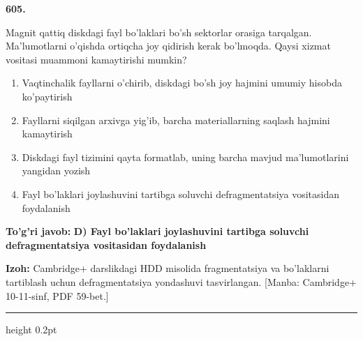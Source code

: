 \documentclass[10pt,a4paper]{article}
\begin{document}
{\bfseries\sffamily\color{ink} 605.}
\par
Magnit qattiq diskdagi fayl bo'laklari bo'sh sektorlar orasiga tarqalgan. Ma'lumotlarni o'qishda ortiqcha joy qidirish kerak bo'lmoqda. Qaysi xizmat vositasi muammoni kamaytirishi mumkin?
\begin{enumerate}[label=\Alph*),leftmargin=9mm]
\item Vaqtinchalik fayllarni o'chirib, diskdagi bo'sh joy hajmini umumiy hisobda ko'paytirish
\item Fayllarni siqilgan arxivga yig'ib, barcha materiallarning saqlash hajmini kamaytirish
\item Diskdagi fayl tizimini qayta formatlab, uning barcha mavjud ma'lumotlarini yangidan yozish
\item Fayl bo'laklari joylashuvini tartibga soluvchi defragmentatsiya vositasidan foydalanish
\end{enumerate}
\begin{tcolorbox}[enhanced,breakable,colback=teal!4,colframe=teal!60!black,boxrule=0.45pt,arc=1.2mm,left=2.7mm,right=2.7mm,top=1.8mm,bottom=1.8mm,before skip=2mm,after skip=2mm]
{\bfseries\sffamily\color{teal}To'g'ri javob:} \textbf{D) Fayl bo'laklari joylashuvini tartibga soluvchi defragmentatsiya vositasidan foydalanish}
\par\smallskip
{\bfseries Izoh:} Cambridge+ darslikdagi HDD misolida fragmentatsiya va bo'laklarni tartiblash uchun defragmentatsiya yondashuvi tasvirlangan. [Manba: Cambridge+ 10-11-sinf, PDF 59-bet.]
\end{tcolorbox}
\vspace{2mm}\hrule height 0.2pt\vspace{3mm}
\end{document}
